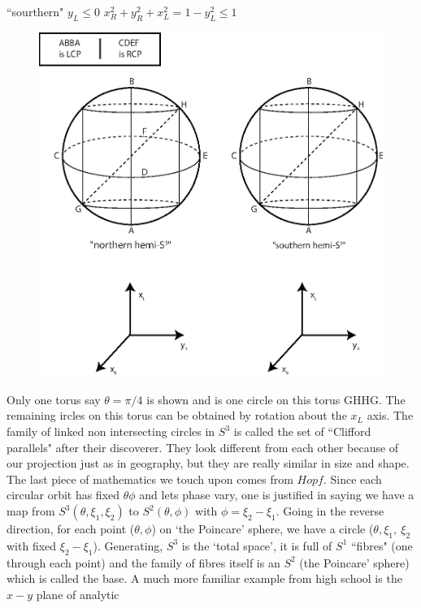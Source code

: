 {} \hspace{1.5cm} ``sourthern" $y_{L} \leq  0$ \quad  $x^2_R + y^2_R + x^2_L = 1 - y^2_L \leq 1$
\begin{figure}[H]
\centering
\includegraphics[scale=0.4]{src/images/chap26/15.jpg}
\end{figure}
Only one torus say $\theta  = \pi/4$ is shown and is one circle on this torus GHHG.
The remaining ircles on this torus can be obtained by rotation about the $x_L$ axis.
The family of linked non intersecting circles in $S^3$ is called the set of ``Clifford
parallels" after their discoverer. They
look different from each other because of our projection just as in geography,
but they are really similar in size and shape. The last piece of mathematics
we touch upon comes from $Hopf$. Since each circular orbit has fixed $\theta \phi$ and
lets phase vary, one is justified in saying we have a map from $S^3 (\theta, \xi_1, \xi_2)$ to
$S^2 (\theta, \phi)$ with $\phi = \xi_2 - \xi_1$. Going in the reverse direction, for each point ($\theta, \phi$) on
`the Poincare' sphere, we have a circle ($\theta, \xi_1,~ \xi_2$ with fixed $\xi_2 - \xi_1$). Generating, $S^3$ is the `total space', it is full of $S^1$ ``fibres" (one through each point) and the family of fibres itself is an $S^2$ (the Poincare' sphere) which is called the base.
A much more familiar example from high school is the $x - y$ plane of analytic
